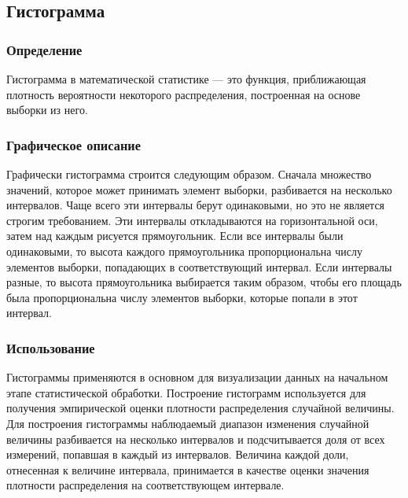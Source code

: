 \documentclass[a4]{article}
\begin{document}
		
		\subsection{Гистограмма}
			\subsubsection{Определение}
				Гистограмма в математической статистике — это функция, приближающая
				плотность вероятности некоторого распределения, построенная на основе
				выборки из него.

		
			\subsubsection{Графическое описание}
				Графически гистограмма строится следующим образом. Сначала множество значений, которое может принимать элемент выборки, разбивается на
				несколько интервалов. Чаще всего эти интервалы берут одинаковыми, но
				это не является строгим требованием. Эти интервалы откладываются на
				горизонтальной оси, затем над каждым рисуется прямоугольник. Если все
				интервалы были одинаковыми, то высота каждого прямоугольника пропорциональна числу элементов выборки, попадающих в соответствующий
				интервал. Если интервалы разные, то высота прямоугольника выбирается
				таким образом, чтобы его площадь была пропорциональна числу элементов
				выборки, которые попали в этот интервал.
			\subsubsection{Использование}
				Гистограммы применяются в основном для визуализации данных на начальном этапе статистической обработки.
				Построение гистограмм используется для получения эмпирической оценки
				плотности распределения случайной величины. Для построения гистограммы наблюдаемый диапазон изменения случайной величины разбивается на
				несколько интервалов и подсчитывается доля от всех измерений, попавшая
				в каждый из интервалов. Величина каждой доли, отнесенная к величине
				интервала, принимается в качестве оценки значения плотности распределения на соответствующем интервале.
				
\end{document}
